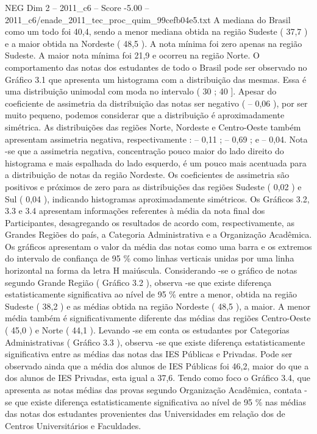 \begin{textsample}{NEG Dim 2 – 2011\_c6 – Score -5.00 – 2011\_c6/enade\_2011\_tec\_proc\_quim\_99cefb04e5.txt}
A mediana do Brasil como um todo foi 40,4, sendo a menor mediana obtida na região Sudeste ( 37,7 ) e a maior obtida na Nordeste ( 48,5 ).
A nota mínima foi zero apenas na região Sudeste.
A maior nota mínima foi 21,9 e ocorreu na região Norte.
O comportamento das notas dos estudantes de todo o Brasil pode ser observado no Gráfico 3.1 que apresenta um histograma com a distribuição das mesmas.
Essa é uma distribuição unimodal com moda no intervalo ( 30 ; 40 ].
Apesar do coeficiente de assimetria da distribuição das notas ser negativo ( – 0,06 ), por ser muito pequeno, podemos considerar que a distribuição é aproximadamente simétrica.
As distribuições das regiões Norte, Nordeste e Centro-Oeste também apresentam assimetria negativa, respectivamente : – 0,11 ; – 0,69 ; e – 0,04.
Nota -se que a assimetria negativa, concentração pouco maior do lado direito do histograma e mais espalhada do lado esquerdo, é um pouco mais acentuada para a distribuição de notas da região Nordeste.
Os coeficientes de assimetria são positivos e próximos de zero para as distribuições das regiões Sudeste ( 0,02 ) e Sul ( 0,04 ), indicando histogramas aproximadamente simétricos.
Os Gráficos 3.2, 3.3 e 3.4 apresentam informações referentes à média da nota final dos Participantes, desagregando os resultados de acordo com, respectivamente, as Grandes Regiões do país, a Categoria Administrativa e a Organização Acadêmica.
Os gráficos apresentam o valor da média das notas como uma barra e os extremos do intervalo de confiança de 95 \% como linhas verticais unidas por uma linha horizontal na forma da letra H maiúscula.
Considerando -se o gráfico de notas segundo Grande Região ( Gráfico 3.2 ), observa -se que existe diferença estatisticamente significativa ao nível de 95 \% entre a menor, obtida na região Sudeste ( 38,2 ) e as médias obtida na região Nordeste ( 48,5 ), a maior.
A menor média também é significativamente diferente das médias das regiões Centro-Oeste ( 45,0 ) e Norte ( 44,1 ).
Levando -se em conta os estudantes por Categorias Administrativas ( Gráfico 3.3 ), observa -se que existe diferença estatisticamente significativa entre as médias das notas das IES Públicas e Privadas.
Pode ser observado ainda que a média dos alunos de IES Públicas foi 46,2, maior do que a dos alunos de IES Privadas, esta igual a 37,6.
Tendo como foco o Gráfico 3.4, que apresenta as notas médias das provas segundo Organização Acadêmica, contata -se que existe diferença estatisticamente significativa ao nível de 95 \% nas médias das notas dos estudantes provenientes das Universidades em relação dos de Centros Universitários e Faculdades.

\end{textsample}
